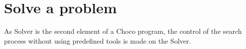 \begin{description}
\end{description}


\section{Solve a problem}\label{solver:solveaproblem}\hypertarget{solver:solveaproblem}{}
As Solver is the second element of a Choco program, the control of the search process without using predefined tools is made on the Solver.

